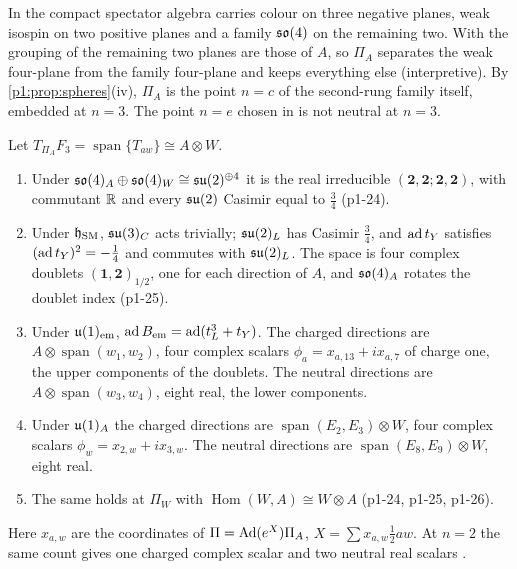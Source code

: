 In \cite[Prop.~10.12]{ES17} the compact spectator algebra carries colour on three negative planes, weak isospin on two positive planes and a family $\mathfrak{so}(4)$ on the remaining
two. With the grouping of \cite[Section~8]{ES17} the remaining two planes are those of $A$, so $\Pi_A$ separates the weak four-plane from the family four-plane and keeps
everything else (interpretive). By \cref{p1:prop:spheres}(iv), $\Pi_A$ is the point $n=c$ of the second-rung family itself, embedded at $n=3$. The point $n=e$ chosen in
\cite[Def.~26.5]{ES17} is not neutral at $n=3$.

\begin{theorem}
\label{p1:thm:tangent}
Let $T_{\Pi_A}F_3=\operatorname{span}\{T_{aw}\}\cong A\otimes W$.
\begin{enumerate}[label=(\roman*),leftmargin=2.2em]
\item Under $\mathfrak{so}(4)_A\oplus\mathfrak{so}(4)_W\cong\mathfrak{su}(2)^{\oplus4}$ it is the real irreducible $(\mathbf2,\mathbf2;\mathbf2,\mathbf2)$, with commutant $\mathbb{R}$ and every $\mathfrak{su}(2)$ Casimir equal to
$\tfrac34$ (p1-24).
\item Under $\mathfrak h_{\rm SM}$, $\mathfrak{su}(3)_C$ acts trivially; $\mathfrak{su}(2)_L$ has Casimir $\tfrac34$, and $\operatorname{ad} t_Y$ satisfies $(\operatorname{ad} t_Y)^2=-\tfrac14$ and commutes with $\mathfrak{su}(2)_L$. The space is four
complex doublets $(\mathbf1,\mathbf2)_{1/2}$, one for each direction of $A$, and $\mathfrak{so}(4)_A$ rotates the doublet index (p1-25).
\item Under $\mathfrak{u}(1)_{\rm em}$, $\operatorname{ad} B_{\rm em}=\operatorname{ad}(t^3_L+t_Y)$. The charged directions are $A\otimes\operatorname{span}(w_1,w_2)$, four complex scalars
$\phi_a=x_{a,13}+ix_{a,7}$ of charge one, the upper components of the doublets. The neutral directions are $A\otimes\operatorname{span}(w_3,w_4)$, eight real, the lower
components.
\item Under $\mathfrak{u}(1)_A$ the charged directions are $\operatorname{span}(E_2,E_3)\otimes W$, four complex scalars $\phi_w=x_{2,w}+ix_{3,w}$. The neutral directions are
$\operatorname{span}(E_8,E_9)\otimes W$, eight real.
\item The same holds at $\Pi_W$ with $\operatorname{Hom}(W,A)\cong W\otimes A$ (p1-24, p1-25, p1-26).
\end{enumerate}
Here $x_{a,w}$ are the coordinates of $\Pi=\operatorname{Ad}(e^X)\Pi_A$, $X=\sum x_{a,w}\tfrac12aw$. At $n=2$ the same count gives one charged complex scalar and two neutral real
scalars \cite[Thm.~26.7]{ES17}.
\end{theorem}

